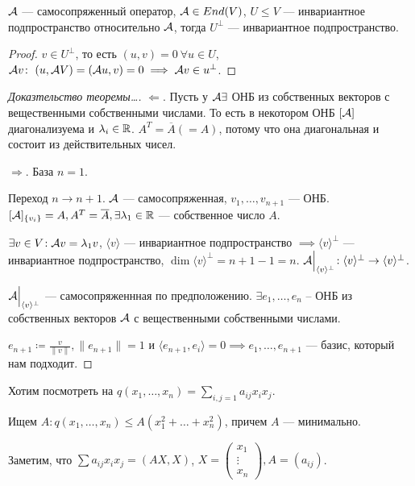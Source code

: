 \begin{statement}
    $\mathcal{A}$ --- самосопряженный оператор,  $\mathcal{A} \in End(V)$,  $U \le V$ --- инвариантное подпространство относительно $\mathcal{A}$, тогда  $U^\perp$ --- инвариантное подпространство. 
\end{statement}
\begin{proof}
    $v \in U^\perp$, то есть  $(u, v) = 0\ \forall u \in U$,  $\mathcal{A} v\!:\ (u, \mathcal{A} V) = (\mathcal{A} u, v) = 0 \implies \mathcal{A} v \in u^\perp$.
\end{proof}
\begin{proof}[Доказтельство теоремы\dots]
    $\Leftarrow$. Пусть у  $\mathcal{A} \exists$ ОНБ из собственных векторов с вещественными собственными числами. То есть в некотором ОНБ $[\mathcal{A}]$ диагонализуема и  $\lambda_i \in \mathbb{R}$.  $A^T = \overline{A}(= A)$, потому что она диагональная и состоит из действительных чисел. 

    $\Rightarrow$. База $n=1$.

    Переход  $n \to n+1$.  $\mathcal{A}$ --- самосопряженная,  $v_1, \ldots, v_{n+1}$ --- ОНБ. $[\mathcal{A}]_{\{v_i\}} = A, A^T = \overline{A}, \exists \lambda_1 \in \mathbb{R}$ --- собственное число $A$.

    $\exists v \in V\!: \mathcal{A} v = \lambda_1 v$, $\langle v \rangle$ --- инвариантное подпространство  $\implies \langle v \rangle^\perp$ --- инвариантное подпространство,  $\dim \langle v \rangle^{\perp} = n  + 1 - 1 = n$.  $\mathcal{A} \Big|_{\langle v \rangle^{\perp}}\!: \langle v \rangle^\perp \to \langle v \rangle ^\perp$.

    $\mathcal{A}\Big|_{\langle v \rangle^\perp}$ --- самосопряженнная по предположению.  $\exists e_1, \ldots ,e_n$ -- ОНБ из собственных векторов $\mathcal{A}$ с вещественными собственными числами.

    $e_{n+1} \coloneqq \frac{v}{\|v\|}, \|e_{n+1}\| = 1$ и $\langle e_{n+1}, e_i \rangle = 0 \implies e_1, \ldots, e_{n+1}$ --- базис, который нам подходит. 
\end{proof}

Хотим посмотреть на $q(x_1, \ldots, x_n) = \sum\limits_{i,j=1} a_{ij} x_ix_j$.

Ищем $A\!: q(x_1, \ldots, x_n) \le A(x_1^2 + \ldots + x_n^2)$, причем $A$ --- минимально.

Заметим, что  $\sum a_{ij} x_ix_j = (AX, X)$,  $X = \begin{pmatrix} x_1 \\ \vdots \\ x_n \end{pmatrix}, A = (a_{ij})$.

